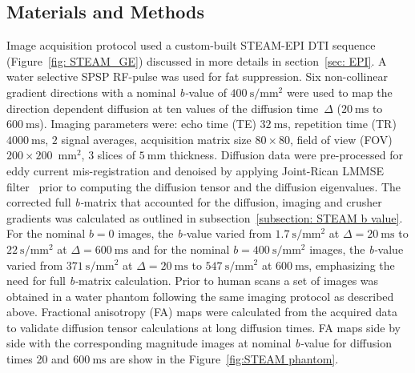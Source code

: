 \subsection{Materials and Methods}
Image acquisition protocol used a custom-built STEAM-EPI DTI sequence (Figure~\ref{fig: STEAM_GE}) discussed in more details in section~\ref{sec: EPI}. 
A water selective SPSP RF-pulse was used for fat suppression. 
Six non-collinear gradient directions with a nominal \mbox{\textit{b-}value} of $\SI{400}{\second \per\milli\meter^2}$ were used to map the direction dependent diffusion at ten values of the diffusion time~$\Delta$ ($\SI{20}{\milli\second}$ to $\SI{600}{\milli\second}$). 
Imaging parameters were: echo time (TE) $\SI{32}{\milli\second}$, repetition time (TR) $\SI{4000}{\milli\second}$, $2$ signal averages, acquisition matrix size $80 \times 80$, field of view (FOV) $200 \times 200 \; \SI{}{\milli\meter^2}$, 3 slices of $\SI{5}{\milli\meter}$ thickness. 
Diffusion data were pre-processed for eddy current mis-registration and denoised by applying Joint-Rican LMMSE filter~\cite{RND24} prior to computing the diffusion tensor and the diffusion eigenvalues. 
The corrected full \textit{b-}matrix that accounted for the diffusion, imaging and crusher gradients was calculated as outlined in subsection~\ref{subsection: STEAM b value}. For the nominal $b = 0$ images, the \mbox{\textit{b-}value} varied from $\SI{1.7}{\second \per  \milli\meter^2}$ at $\Delta = \SI{20}{\milli\second}$ to $\SI{22}{\second\per\milli\meter^2}$ at $\Delta = \SI{600}{\milli\second}$ and for the nominal $b = \SI{400}{\second\per\milli\meter^2}$ images, the \mbox{\textit{b-}value} varied from $\SI{371}{\second\per\milli\meter^2}$ at $\Delta = \SI{20}{\milli\second}$ to $\SI{547}{\second\per\milli\meter^2}$ at $\SI{600}{\milli\second}$, emphasizing the need for full \textit{b-}matrix calculation. 
Prior to human scans a set of images was obtained in a water phantom following the same imaging protocol as described above. 
Fractional anisotropy (FA) maps were calculated from the acquired data to validate diffusion tensor calculations at long diffusion times. 
FA maps side by side with the corresponding magnitude images at nominal \mbox{\textit{b-}value} for diffusion times 20 and $\SI{600}{\milli\second}$ are show in the Figure~\ref{fig:STEAM phantom}. 
